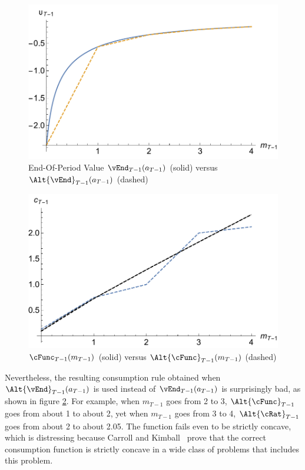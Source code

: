 \documentclass[titlepage]{\econtex}
\begin{document}
\hypertarget{PlotOTm1RawVSInt}{}
\begin{figure}
  \includegraphics{./Figures/PlotOTm1RawVSInt}
  \caption{End-Of-Period Value $\vEnd_{T-1}({a}_{T-1})$ (solid) versus $\Alt{\vEnd}_{T-1}({a}_{T-1})$ (dashed)}
  \label{fig:PlotOTm1RawVSInt}
\end{figure}

\hypertarget{PlotComparecTm1AB}{}
\begin{figure}
  \includegraphics{./Figures/PlotComparecTm1AB}
  \caption{$\cFunc_{T-1}({m}_{T-1})$ (solid) versus $\Alt{\cFunc}_{T-1}({m}_{T-1})$ (dashed)}
  \label{fig:PlotComparecTm1AB}
\end{figure}

Nevertheless, the resulting consumption rule obtained when $\Alt{\vEnd}_{T-1}({a}_{T-1})$
is used
instead of $\vEnd_{T-1}({a}_{T-1})$ is surprisingly bad, as
shown in figure \ref{fig:PlotComparecTm1AB}.  For example, when
${m}_{T-1}$ goes from 2 to 3, $\Alt{\cFunc}_{T-1}$ goes from about 1
to about 2, yet when ${m}_{T-1}$ goes from 3 to 4, $\Alt{\cRat}_{T-1}$
goes from about 2 to about 2.05.  The function fails even to be
strictly concave, which is distressing because Carroll and
Kimball~\citeyearpar{carroll&kimball:concavity} prove that the correct
consumption function is strictly concave in a wide class of problems that
includes this problem.
\end{document}
